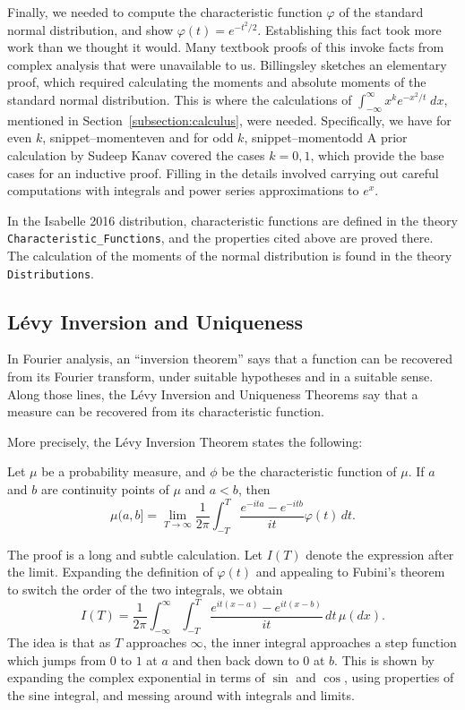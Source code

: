 \documentclass{svjour3}
\newcommand{\ph}{\varphi}
\newcommand{\Snippet}[1]{\csname snippet--#1\endcsname}
\begin{document}
Finally, we needed to compute the characteristic function $\ph$ of the standard normal distribution, and show $\ph(t) = e^{-t^2/2}$. Establishing this fact took more work than we thought it would. Many textbook proofs of this invoke facts from complex analysis that were unavailable to us. Billingsley \cite[page 344]{billingsley:95} sketches an elementary proof, which required calculating the moments and absolute moments of the standard normal distribution. This is where the calculations of $\int_{-\infty}^\infty x^k e^{-x^2 / t} \; dx$, mentioned in Section~\ref{subsection:calculus}, were needed. Specifically, we have for even $k$, 
\Snippet{momenteven}
and for odd $k$,
\Snippet{momentodd}
A prior calculation by Sudeep Kanav covered the cases $k = 0, 1$, which provide the base cases for an inductive proof. Filling in the details involved carrying out careful computations with integrals and power series approximations to $e^x$.

In the Isabelle 2016 distribution, characteristic functions are defined in the theory \texttt{Characteristic\_Functions}, and the properties cited above are proved there. The calculation of the moments of the normal distribution is found in the theory \texttt{Distributions}.

\subsection{L\'evy Inversion and Uniqueness}

In Fourier analysis, an ``inversion theorem'' says that a function can be recovered from its Fourier transform, under suitable hypotheses and in a suitable sense. Along those lines, the L\'evy Inversion and Uniqueness Theorems say that a measure can be recovered from its characteristic function. 

More precisely, the L\'evy Inversion Theorem states the following:
\begin{theorem}
Let $\mu$ be a probability measure, and $\phi$ be the characteristic function of $\mu$. If $a$ and $b$ are continuity points of $\mu$ and $a < b$, then
\[ 
\mu (a,b] = \lim_{T \rightarrow \infty} \frac{1}{2\pi} \int_{-T}^T \frac{e^{-ita} - e^{-itb}}{it} \ph(t) \, dt. 
\]
\end{theorem}

The proof is a long and subtle calculation. Let $I(T)$ denote the expression after the limit. Expanding the definition of $\ph(t)$ and appealing to Fubini's theorem to switch the order of the two integrals, we obtain
\[
I(T) = \frac{1}{2\pi} \int_{-\infty}^\infty \int_{-T}^T \frac{e^{it(x-a)} - e^{it(x-b)}}{it} \, dt \, \mu(dx). 
\]
The idea is that as $T$ approaches $\infty$, the inner integral approaches a step function which jumps from $0$ to $1$ at $a$ and then back down to $0$ at $b$. This is shown by expanding the complex exponential in terms of $\sin$ and $\cos$, using properties of the sine integral, and messing around with integrals and limits.
\end{document}

